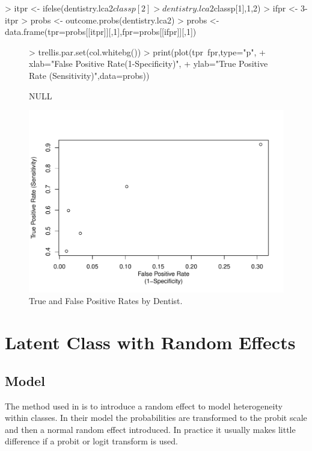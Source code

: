 \begin{Schunk}
\begin{Sinput}
> itpr <- ifelse(dentistry.lca2$classp[2]>dentistry.lca2$classp[1],1,2)
> ifpr <- 3-itpr
> probs <- outcome.probs(dentistry.lca2)
> probs <- data.frame(tpr=probs[[itpr]][,1],fpr=probs[[ifpr]][,1])
\end{Sinput}
\end{Schunk}

\begin{figure}
  \centering
\begin{Schunk}
\begin{Sinput}
> trellis.par.set(col.whitebg())
> print(plot(tpr~fpr,type="p",
+ 	xlab="False Positive Rate\n(1-Specificity)",
+ 	ylab="True Positive Rate (Sensitivity)",data=probs))
\end{Sinput}
\begin{Soutput}
NULL
\end{Soutput}
\end{Schunk}
\includegraphics{randomLCA-example-022}
  \caption{True and False Positive Rates by Dentist.}
  \label{fig:truefalse}
\end{figure}

\section{Latent Class with Random Effects}

\subsection{Model}

The method used in \citet{qu:1996} is to introduce a random effect to model heterogeneity within classes. In their model the probabilities are transformed to the probit scale and then a normal random effect introduced. In practice it usually makes little difference if a probit or logit transform is used.

